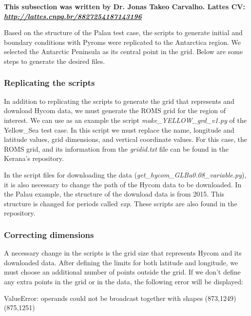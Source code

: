 \textbf{This subsection was written by Dr. Jonas Takeo Carvalho.  \newline Lattes CV: \textit{\textcolor{bleu_cite}{\href{http://lattes.cnpq.br/8827254187143196}{http://lattes.cnpq.br/8827254187143196}}}} 
\bigskip

Based on the structure of the Palau test case, the scripts to generate initial and boundary conditions with Pyroms were replicated to the Antarctica region. 
We selected the Antarctic Peninsula as its central point in the grid. Below are some steps to generate the desired files.
\bigskip

\subsubsection{Replicating the scripts}
\bigskip

In addition to replicating the scripts to generate the grid that represents and download Hycom data, we must generate the ROMS grid for the region of interest.
 We can use as an example the script \textit{make\_YELLOW\_grd\_v1.py} of the Yellow\_Sea test case. In this script we must replace the name, longitude and latitude values, 
 grid dimensions, and vertical coordinate values. For this case, the ROMS grid, and its information from the \textit{gridid.txt} file can be found in the 
 Kerana's repository. 
\bigskip

In the script files for downloading the data (\textit{get\_hycom\_GLBa0.08\_variable.py}), it is also necessary to change the path of the Hycom data to be 
downloaded. In the Palau example, the structure of the download data is from 2015. This structure is changed for periods called \textit{exp}. These scripts are also 
found in the repository.
\bigskip

\subsubsection{Correcting dimensions}
\bigskip

A necessary change in the scripts is the grid size that represents Hycom and its downloaded data. After defining the limits for both latitude and longitude,
we must choose an additional number of points outside the grid. If we don't define any extra points in the grid or in the data, the following error will be displayed:
\bigskip

\begin{bashcode}[fontsize=\scriptsize]
ValueError: operands could not be broadcast together with shapes (873,1249) (875,1251)
\end{bashcode}
\bigskip

